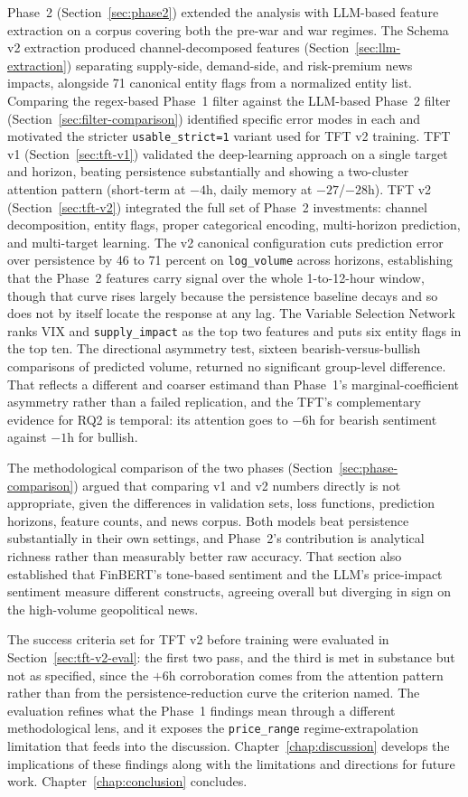 Phase~2 (Section~\ref{sec:phase2}) extended the analysis with LLM-based feature extraction on a corpus covering both the pre-war and war regimes. The Schema v2 extraction produced channel-decomposed features (Section~\ref{sec:llm-extraction}) separating supply-side, demand-side, and risk-premium news impacts, alongside 71 canonical entity flags from a normalized entity list. Comparing the regex-based Phase~1 filter against the LLM-based Phase~2 filter (Section~\ref{sec:filter-comparison}) identified specific error modes in each and motivated the stricter \texttt{usable\_strict=1} variant used for TFT v2 training. TFT v1 (Section~\ref{sec:tft-v1}) validated the deep-learning approach on a single target and horizon, beating persistence substantially and showing a two-cluster attention pattern (short-term at $-4$h, daily memory at $-27$/$-28$h). TFT v2 (Section~\ref{sec:tft-v2}) integrated the full set of Phase~2 investments: channel decomposition, entity flags, proper categorical encoding, multi-horizon prediction, and multi-target learning. The v2 canonical configuration cuts prediction error over persistence by 46 to 71 percent on \texttt{log\_volume} across horizons, establishing that the Phase~2 features carry signal over the whole 1-to-12-hour window, though that curve rises largely because the persistence baseline decays and so does not by itself locate the response at any lag. The Variable Selection Network ranks VIX and \texttt{supply\_impact} as the top two features and puts six entity flags in the top ten. The directional asymmetry test, sixteen bearish-versus-bullish comparisons of predicted volume, returned no significant group-level difference. That reflects a different and coarser estimand than Phase~1's marginal-coefficient asymmetry rather than a failed replication, and the TFT's complementary evidence for RQ2 is temporal: its attention goes to $-6$h for bearish sentiment against $-1$h for bullish.

The methodological comparison of the two phases (Section~\ref{sec:phase-comparison}) argued that comparing v1 and v2 numbers directly is not appropriate, given the differences in validation sets, loss functions, prediction horizons, feature counts, and news corpus. Both models beat persistence substantially in their own settings, and Phase~2's contribution is analytical richness rather than measurably better raw accuracy. That section also established that FinBERT's tone-based sentiment and the LLM's price-impact sentiment measure different constructs, agreeing overall but diverging in sign on the high-volume geopolitical news.

The success criteria set for TFT v2 before training were evaluated in Section~\ref{sec:tft-v2-eval}: the first two pass, and the third is met in substance but not as specified, since the $+6$h corroboration comes from the attention pattern rather than from the persistence-reduction curve the criterion named. The evaluation refines what the Phase~1 findings mean through a different methodological lens, and it exposes the \texttt{price\_range} regime-extrapolation limitation that feeds into the discussion. Chapter~\ref{chap:discussion} develops the implications of these findings along with the limitations and directions for future work. Chapter~\ref{chap:conclusion} concludes.
